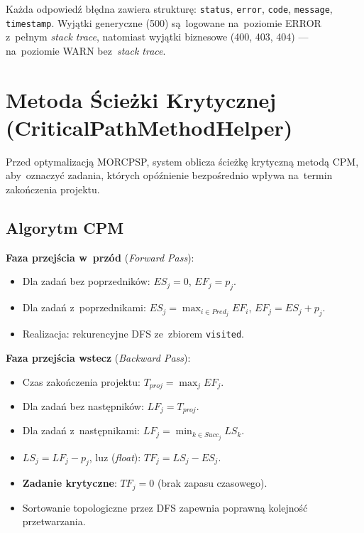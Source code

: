 Każda odpowiedź błędna zawiera strukturę: \texttt{status}, \texttt{error}, \texttt{code}, \texttt{message}, \texttt{timestamp}. Wyjątki generyczne (500) są~logowane na~poziomie ERROR z~pełnym \textit{stack trace}, natomiast wyjątki biznesowe (400, 403, 404) --- na~poziomie WARN bez~\textit{stack trace}.

\section{Metoda Ścieżki Krytycznej (CriticalPathMethodHelper)}

Przed optymalizacją MORCPSP, system oblicza ścieżkę krytyczną metodą CPM, aby~oznaczyć zadania, których opóźnienie bezpośrednio wpływa na~termin zakończenia projektu.

\subsection{Algorytm CPM}

\textbf{Faza przejścia w~przód} (\textit{Forward Pass}):
\begin{itemize}
    \item Dla zadań bez poprzedników: $ES_j = 0$, $EF_j = p_j$.
    \item Dla zadań z~poprzednikami: $ES_j = \max_{i \in Pred_j} EF_i$, $EF_j = ES_j + p_j$.
    \item Realizacja: rekurencyjne DFS ze~zbiorem \texttt{visited}.
\end{itemize}

\textbf{Faza przejścia wstecz} (\textit{Backward Pass}):
\begin{itemize}
    \item Czas zakończenia projektu: $T_{proj} = \max_j EF_j$.
    \item Dla zadań bez następników: $LF_j = T_{proj}$.
    \item Dla zadań z~następnikami: $LF_j = \min_{k \in Succ_j} LS_k$.
    \item $LS_j = LF_j - p_j$, luz (\textit{float}): $TF_j = LS_j - ES_j$.
    \item \textbf{Zadanie krytyczne}: $TF_j = 0$ (brak zapasu czasowego).
    \item Sortowanie topologiczne przez DFS zapewnia poprawną kolejność przetwarzania.
\end{itemize}

